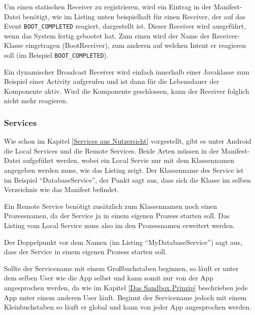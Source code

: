 Um einen statischen Receiver zu registrieren, wird ein Eintrag in der Manifest-Datei ben\"otigt, wie im Listing unten beispielhaft f\"ur einen Receiver, der auf das Event \texttt{BOOT\_COMPLETED} reagiert, dargestellt ist. Dieser Receiver wird ausgef\"uhrt, wenn das System fertig gebootet hat. Zum einen wird der Name der Receiver-Klasse eingetragen (BootReceiver), zum anderen auf welchen Intent er reagieren soll (im Beispiel \texttt{BOOT\_COMPLETED}).



Ein dynamischer Broadcast Receiver wird einfach innerhalb einer Javaklasse zum Beispiel einer Activity aufgerufen und ist dann f\"ur die Lebensdauer der Komponente aktiv. Wird die Komponente geschlossen, kann der Receiver folglich nicht mehr reagieren.

\subsubsection{Services} \label{Services}
Wie schon im Kapitel \ref{Services aus Nutzersicht} vorgestellt, gibt es unter Android die Local Services und die Remote Services. Beide Arten m\"ussen in der Manifest-Datei aufgef\"uhrt werden, wobei ein Local Servie nur mit dem Klassennamen angegeben werden muss, wie das Listing zeigt. Der Klassenname des Service ist im Beispiel "`DatabaseService"', der Punkt sagt aus, dass sich die Klasse im selben Verzeichnis wie das Manifest befindet.



Ein Remote Service ben\"otigt zus\"atzlich zum Klassennamen noch einen Prozessnamen, da der Service ja in einem eigenen Prozess starten soll. Das Listing vom Local Service muss also im den Prozessnamen erweitert werden.

Der Doppelpunkt vor dem Namen (im Listing "`MyDatabaseService"') sagt aus, dass der Service in einem eigenen Prozess starten soll.

Sollte der Servicename mit einem Gro\ss{}buchstaben beginnen, so l\"auft er unter dem selben User wie die App selbst und kann somit nur von der App angesprochen werden, da wie im Kapitel \ref{Das Sandbox Prinzip} beschrieben jede App unter einem anderen User l\"auft. Beginnt der Servicename jedoch mit einem Kleinbuchstaben so l\"auft er global und kann von jeder App angesprochen werden.



